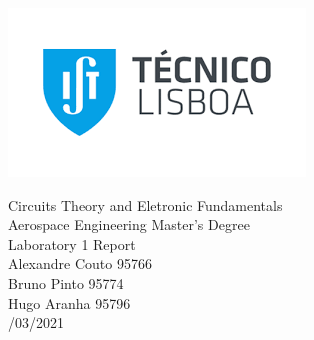 
\thispagestyle {empty}

\includegraphics[bb=9.5cm 11cm 0cm 0cm,scale=0.29]{index.png}

\begin{center}
%
\vspace{1.0cm}

\vspace{1cm}
{\FontLb Circuits Theory and Eletronic Fundamentals} \\ %
\vspace{1cm}
{\FontSn Aerospace Engineering Master's Degree} \\ %
\vspace{1cm}
{\FontSn Laboratory 1 Report } \\
\vspace{1cm}
{\FontSn Alexandre Couto 95766} \\
{\FontSn Bruno Pinto     95774} \\
{\FontSn Hugo Aranha     95796} \\
{/03/2021} \\ %
%
\end{center}

